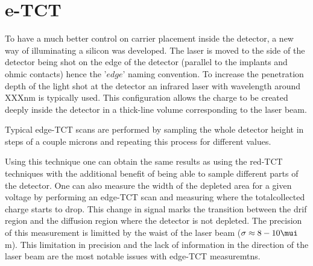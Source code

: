 

\section{e-TCT} %

To have a much better control on carrier placement inside the detector, a new way of illuminating a silicon was developed. The laser is moved to the side of the detector being shot on the edge of the detector (parallel to the implants and ohmic contacts) hence the '$edge$' naming convention. To increase the penetration depth of the light shot at the detector an infrared laser with wavelength around XXXnm is typically used. This configuration allows the charge to be created deeply inside the detector in a thick-line volume corresponding to the laser beam.

Typical edge-TCT scans are performed by sampling the whole detector height in steps of a couple microns and repeating this process for different \vias values.

Using this technique one can obtain the same results as using the red-TCT techniques with the additional benefit of being able to sample different parts of the detector. One can also measure the width of the depleted area for a given voltage by performing an edge-TCT scan and measuring where the totalcollected charge starts to drop. This change in signal marks the transition between the drif region and the diffusion region where the detector is not depleted. The precision of this measurement is limitted by the waist of the laser beam ($\sigma \approx 8-10\mui$ m). This limitation in precision and the lack of information in the direction of the laser beam are the most notable issues with edge-TCT measuremtns.

